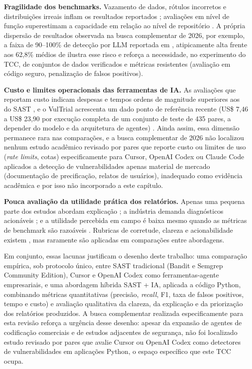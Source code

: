\textbf{Fragilidade dos benchmarks.} Vazamento de dados, rótulos incorretos e distribuições irreais inflam os resultados reportados \cite{Ding2025CodeLMVuln, Chen2023DiverseVul, Chakraborty2022DLLimits}; avaliações em nível de função superestimam a capacidade em relação ao nível de repositório \cite{Wen2026VulEval}. A própria dispersão de resultados observada na busca complementar de 2026, por exemplo, a faixa de 90–100\% de detecção por LLM reportada em \cite{Zhou2024SASTLLMRepo}, atipicamente alta frente aos 62,8\% médios de \cite{Khare2025LLMEffectiveness} ilustra esse risco e reforça a necessidade, no experimento do TCC, de conjuntos de dados verificados e métricas resistentes (avaliação em código seguro, penalização de falsos positivos).

\textbf{Custo e limites operacionais das ferramentas de IA.} As avaliações que reportam custo indicam despesas e tempos ordens de magnitude superiores aos do SAST \cite{Tamberg2025LLMHarness, Li2026ProjectScaleLLM}, e o VulTrial acrescenta um dado ponto de referência recente (US\$ 7,46 a US\$ 23,90 por execução completa de um conjunto de teste de 435 pares, a depender do modelo e da arquitetura de agentes) \cite{Widyasari2026VulTrial}. Ainda assim, essa dimensão permanece rara nas comparações, e a busca complementar de 2026 não localizou nenhum estudo acadêmico revisado por pares que reporte custo ou limites de uso (\textit{rate limits}, cotas) especificamente para Cursor, OpenAI Codex ou Claude Code aplicados a detecção de vulnerabilidades apenas material de mercado (documentação de precificação, relatos de usuários), inadequado como evidência acadêmica e por isso não incorporado a este capítulo.

\textbf{Pouca avaliação da utilidade prática dos relatórios.} Apenas uma pequena parte dos estudos abordam explicação \cite{Germano2025LLMSLR}; a indústria demanda diagnósticos acionáveis \cite{Li2025IndustrySAST}; e a utilidade percebida em campo é baixa mesmo quando as métricas de benchmark são razoáveis \cite{Steenhoek2025IDEUserStudy}. Rubricas de corretude, clareza e acionabilidade existem \cite{Mao2025ExplainableVD}, mas raramente são aplicadas em comparações entre abordagens.

Em conjunto, essas lacunas justificam o desenho deste trabalho: uma comparação empírica, sob protocolo único, entre SAST tradicional (Bandit e Semgrep Community Edition), Cursor e OpenAI Codex como ferramentas-agente empresariais, e uma abordagem híbrida SAST + IA, aplicada a código Python, combinando métricas quantitativas (precisão, \textit{recall}, F1, taxa de falsos positivos, tempo e custo) e avaliação qualitativa da clareza, da explicação e da priorização dos relatórios produzidos. A busca complementar realizada especificamente para esta revisão reforça a urgência desse desenho: apesar da expansão de agentes de codificação comerciais e de estudos adjacentes de segurança, não foi localizado estudo revisado por pares que avalie Cursor ou OpenAI Codex como detectores de vulnerabilidades em aplicações Python, o espaço específico que este TCC ocupa.
